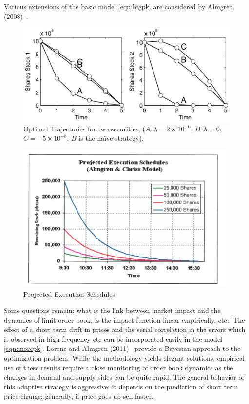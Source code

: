 Various extensions of the basic model \eqref{eqn:bigpk} are considered by Almgren (2008)~\cite{alm2008}.
	
	\begin{figure}[!ht]
	\centering
	\includegraphics[width=\textwidth]{chapters/chapter_exec_models/figures/opt_traj.png}
	\caption{Optimal Trajectories for two securities; ($A: \lambda= 2 \times 10^{-6}$; $B: \lambda=0$; $C= -5 \times 10^{-8}$; $B$ is the na\"ive strategy). \label{fig:7first}}
	\end{figure}
	\begin{figure}[!ht] 
	\centering
	\includegraphics[width=\textwidth]{chapters/chapter_exec_models/figures/temp2.png}
	\caption{Projected Execution Schedules \label{fig:7second}}
	\end{figure} 
 

Some questions remain: what is the link between market impact and the dynamics of limit order book, is the impact function linear empirically, etc.. The effect of a short term drift in prices and the serial correlation in the errors which is observed in high frequency etc can be incorporated easily in the model \eqref{eqn:morepk}. Lorenz and Almgren (2011)~\cite{lovenz2011} provide a Bayesian approach to the optimization problem. While the methodology yields elegant solutions, empirical use of these results require a close monitoring of order book dynamics as the changes in demand and supply sides can be quite rapid. The general behavior of this adaptive strategy is aggressive; it depends on the prediction of short term price change; generally, if price goes up sell faster. 


